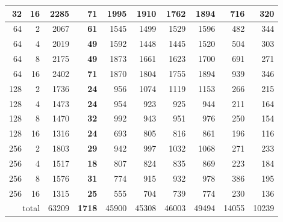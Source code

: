 \begin{table}[t]
\begin{tabular}{rr r rrrrrrr}
32 & 16 & 2285 & \textbf{71} & 1995 & 1910 & 1762 & 1894 & 716 & 320 \\
\midrule
64 & 2 & 2067 & \textbf{61} & 1545 & 1499 & 1529 & 1596 & 482 & 344 \\
64 & 4 & 2019 & \textbf{49} & 1592 & 1448 & 1445 & 1520 & 504 & 303 \\
64 & 8 & 2175 & \textbf{49} & 1873 & 1661 & 1623 & 1700 & 691 & 271 \\
64 & 16 & 2402 & \textbf{71} & 1870 & 1804 & 1755 & 1894 & 939 & 346 \\
\midrule
128 & 2 & 1736 & \textbf{24} & 956 & 1074 & 1119 & 1153 & 266 & 215 \\
128 & 4 & 1473 & \textbf{24} & 954 & 923 & 925 & 944 & 211 & 164 \\
128 & 8 & 1470 & \textbf{32} & 992 & 943 & 951 & 976 & 250 & 154 \\
128 & 16 & 1316 & \textbf{24} & 693 & 805 & 816 & 861 & 196 & 116 \\
\midrule
256 & 2 & 1803 & \textbf{29} & 942 & 997 & 1032 & 1068 & 271 & 233 \\
256 & 4 & 1517 & \textbf{18} & 807 & 824 & 835 & 869 & 223 & 184 \\
256 & 8 & 1576 & \textbf{31} & 774 & 915 & 932 & 978 & 386 & 195 \\
256 & 16 & 1315 & \textbf{25} & 555 & 704 & 739 & 774 & 230 & 136 \\
\midrule
\multicolumn{2}{r}{total} & 63209 & \textbf{1718} & 45900 & 45308 & 46003 & 49494 & 14055 & 10239 \\
\bottomrule
\end{tabular}
\end{table}
